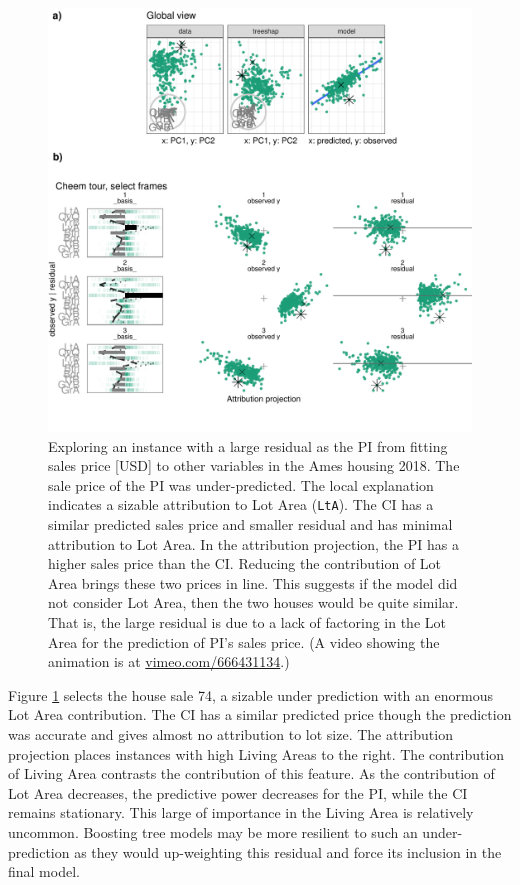 \documentclass[
]{article}
\begin{document}
\begin{figure}

{\centering \includegraphics[width=1\linewidth]{./figures/case_ames2018} 

}

\caption{Exploring an instance with a large residual as the PI from fitting sales price {[}USD{]} to other variables in the Ames housing 2018. The sale price of the PI was under-predicted. The local explanation indicates a sizable attribution to Lot Area (\texttt{LtA}). The CI has a similar predicted sales price and smaller residual and has minimal attribution to Lot Area. In the attribution projection, the PI has a higher sales price than the CI. Reducing the contribution of Lot Area brings these two prices in line. This suggests if the model did not consider Lot Area, then the two houses would be quite similar. That is, the large residual is due to a lack of factoring in the Lot Area for the prediction of PI's sales price. (A video showing the animation is at \href{https://vimeo.com/666431134}{vimeo.com/666431134}.)}\label{fig:caseames}
\end{figure}

Figure \ref{fig:caseames} selects the house sale 74, a sizable under prediction with an enormous Lot Area contribution. The CI has a similar predicted price though the prediction was accurate and gives almost no attribution to lot size. The attribution projection places instances with high Living Areas to the right. The contribution of Living Area contrasts the contribution of this feature. As the contribution of Lot Area decreases, the predictive power decreases for the PI, while the CI remains stationary. This large of importance in the Living Area is relatively uncommon. Boosting tree models may be more resilient to such an under-prediction as they would up-weighting this residual and force its inclusion in the final model.
\end{document}
